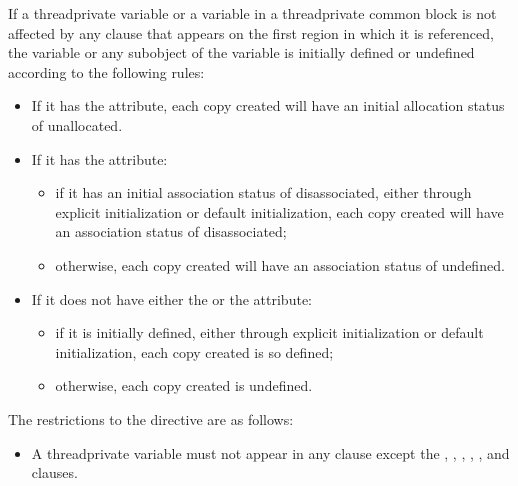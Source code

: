 {{{{If a threadprivate variable or a variable in a threadprivate common block is 
not affected by any  clause that appears on the first  region in which 
it is referenced, the variable or any subobject of the variable is initially defined or 
undefined according to the following rules:

\begin{itemize} %
\item If it has the  attribute, each copy created will have an initial 
allocation status of unallocated.

\item If it has the  attribute:
\begin{itemize} %
\item if it has an initial association status of disassociated, either through explicit 
initialization or default initialization, each copy created will have an association 
status of disassociated;
\item otherwise, each copy created will have an association status of undefined.
\end{itemize} %

\item If it does not have either the  or the  attribute:

\begin{samepage}\begin{itemize} %
\item if it is initially defined, either through explicit initialization or default 
initialization, each copy created is so defined;

\item otherwise, each copy created is undefined.
\end{itemize} %
\end{samepage}

\end{itemize} %
\fortranspecificend

\restrictions
The restrictions to the  directive are as follows:

\begin{itemize} %
\item A threadprivate variable must not appear in any clause except the , 
, , , , and  clauses.


\end{itemize}}}}}
